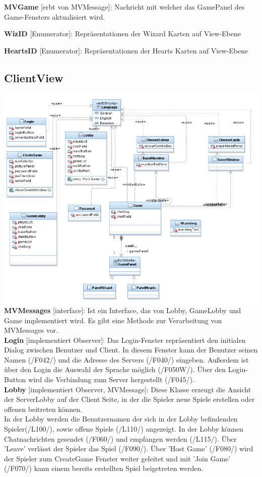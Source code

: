 \documentclass{article}
\begin{document}
\textbf{MVGame} [erbt von MVMessage]: Nachricht mit welcher das GamePanel des Game-Fensters aktualisiert wird.

\textbf{WizID} [Enumerator]: Repräsentationen der Wizard Karten auf View-Ebene

\textbf{HeartsID} [Enumerator]: Repräsentationen der Hearts Karten auf View-Ebene

\subsection{ClientView}
\includegraphics[width=\textwidth]{ClientView}
\textbf{MVMessages} [interface]:  Ist ein Interface, das von Lobby, GameLobby und Game implementiert wird. Es gibt eine Methode zur Verarbeitung von MVMessages vor. \\

\textbf{Login} [implementiert Observer]: Das Login-Fenster repräsentiert den initialen Dialog zwischen Benutzer und Client.
In diesem Fenster kann der Benutzer seinen Namen (/F042/) und die Adresse des Servers (/F040/) eingeben. Außerdem ist über den Login die Auswahl der Sprache möglich (/F050W/). Über den Login-Button wird die Verbindung zum Server hergestellt (/F045/).\\

\textbf{Lobby} [implementiert Observer, MVMessage]: Diese Klasse erzeugt die Ansicht der ServerLobby auf der Client Seite, in der die Spieler neue Spiele erstellen oder offenen beitreten können.\\
In der Lobby werden die Benutzernamen der sich in der Lobby befindenden Spieler(/L100/), sowie offene Spiele (/L110/) angezeigt. In der Lobby können Chatnachrichten gesendet (/F060/) und empfangen werden (/L115/). Über 'Leave' verlässt der Spieler das Spiel (/F090/). Über 'Host Game' (/F080/) wird der Spieler zum CreateGame Fenster weiter geleitet und mit 'Join Game' (/F070/) kann einem bereits erstellten Spiel beigetreten werden. \\
\end{document}
